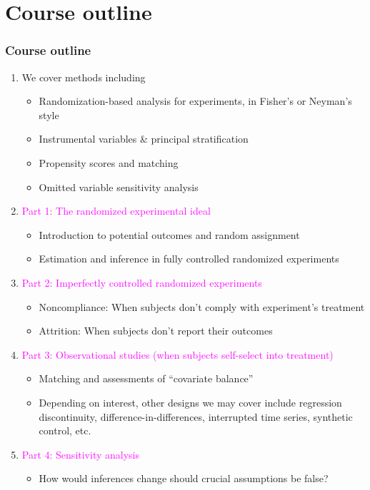 \documentclass[table, xcolor = {dvipsnames}, 9pt]{beamer}
\theoremstyle{plain}
\begin{document}
\section{Course outline}
\begin{frame}[t]
\frametitle{Course outline}
\vfill
\begin{enumerate} \vfill
\item[] We cover methods including  \vfill
  \begin{itemize}\vfill
    \item Randomization-based analysis for experiments, in Fisher's or
      Neyman's style\vfill
  \item Instrumental variables \& principal stratification  \vfill
  \item Propensity scores and matching  \vfill
  \item Omitted variable sensitivity analysis  \vfill
  \end{itemize}\vfill 
\item[] \textcolor{magenta}{Part 1: The randomized experimental ideal} \vfill
\begin{itemize} \vfill
\item Introduction to potential outcomes and random assignment \vfill
\item Estimation and inference in fully controlled randomized experiments \vfill
\end{itemize} \vfill
\item[] \textcolor{magenta}{Part 2: Imperfectly controlled randomized experiments} \vfill
\begin{itemize} \vfill
\item Noncompliance: When subjects don't comply with experiment's treatment \vfill
\item Attrition: When subjects don't report their outcomes \vfill
\end{itemize} \vfill
\item[] \textcolor{magenta}{Part 3: Observational studies (when subjects self-select into treatment)} \vfill
\begin{itemize} \vfill
\item Matching and assessments of ``covariate balance'' \vfill
\item Depending on interest, other designs we may cover include regression discontinuity, difference-in-differences, interrupted time series, synthetic control, etc. \vfill
\end{itemize} \vfill
\item[] \textcolor{magenta}{Part 4: Sensitivity analysis} \vfill
\begin{itemize} \vfill
\item How would inferences change should crucial assumptions be false? \vfill
\end{itemize} \vfill
\end{enumerate}
\vfill
\end{frame}
\end{document}
